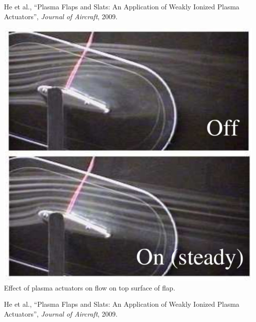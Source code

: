 \documentclass{projector}
\begin{document}
\begin{slide}
\vfill
\begin{minipage}[c]{0.3\textwidth}
He et al., ``Plasma Flaps and Slats: An Application of Weakly Ionized Plasma Actuators'', \emph{Journal of Aircraft}, 2009.
\end{minipage}
\hfill
\begin{minipage}[c]{0.3\textwidth}
\includegraphics[align=t,width=1.0\textwidth]{flap.jpg}\\
Effect of plasma actuators on flow on top surface of flap.
\end{minipage}
\hfill
\begin{minipage}[c]{0.3\textwidth}
He et al., ``Plasma Flaps and Slats: An Application of Weakly Ionized Plasma Actuators'', \emph{Journal of Aircraft}, 2009.
\end{minipage}
\vfill
\end{slide}
\end{document}

